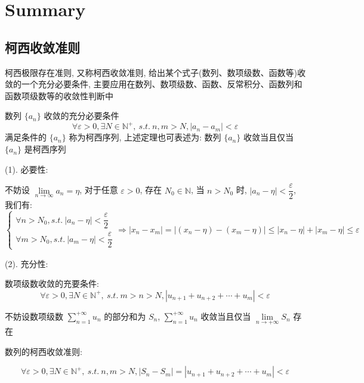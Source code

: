\chapter{Summary}

\section{柯西收敛准则}

\begin{theorem}[柯西收敛准则]\label{the: 柯西收敛准则}
	柯西极限存在准则, 又称柯西收敛准则, 给出某个式子(数列、数项级数、函数等)收敛的一个充分必要条件, 主要应用在数列、数项级数、函数、反常积分、函数列和函数项级数等的收敛性判断中
\end{theorem}

\begin{proposition}[柯西收敛准则:数列]
	数列 $\{a_{n}\}$ 收敛的充分必要条件
	$$\forall \varepsilon > 0, \exists N \in \mathbb{N}^{+},\ s.t.\ n,m > N, |a_{n} - a_{m}| < \varepsilon$$
	满足条件的 $\{a_{n}\}$ 称为柯西序列, 上述定理也可表述为: 数列 $\{a_{n}\}$ 收敛当且仅当 $\{a_{n}\}$ 是柯西序列
\end{proposition}

\begin{anymark}[证明]
	(1). 必要性:

	不妨设 $\lim\limits_{n\to \infty} a_{n} =\eta$, 对于任意 $\varepsilon > 0$, 存在 $N_{0}\in\mathbb{N}$, 当 $n>N_{0}$ 时, $|a_{n}-\eta|<\dfrac{\varepsilon}{2}$, 我们有:
	$$\begin{cases} 
		\forall n > N_{0}, s.t.\ |a_{n} - \eta| < \dfrac{\varepsilon}{2}\\ 
		\forall m > N_{0}, s.t.\ |a_{m} - \eta| < \dfrac{\varepsilon}{2}
	\end{cases}
	\Rightarrow 
	|x_{n}-x_{m}| = |(x_{n} - \eta) - (x_{m} - \eta)| \leq |x_{n} - \eta| + |x_{m}-\eta| \leq \varepsilon$$

	(2). 充分性:


\end{anymark}

\begin{proposition}
	数项级数收敛的充要条件:
	$$\forall \varepsilon > 0, \exists N \in \mathbb{N}^{+},\ s.t.\ m > n > N, |u_{n+1} + u_{n+2} + \cdots + u_{m}| < \varepsilon$$
\end{proposition}

\begin{anymark}[证明]
	不妨设数项级数 $\sum\limits_{n = 1}^{+\infty}u_{n}$ 的部分和为 $S_{n}$, 
	$\sum\limits_{n = 1}^{+\infty}u_{n}$ 收敛当且仅当 $\lim\limits_{n \to +\infty}S_{n}$ 存在

	数列的柯西收敛准则:

	$$\forall \varepsilon > 0, \exists N \in \mathbb{N}^{+},\ s.t.\ n,m > N, |S_{n} - S_{m}| = |u_{n+1} + u_{n+2} + \cdots + u_{m}| < \varepsilon$$
\end{anymark}


